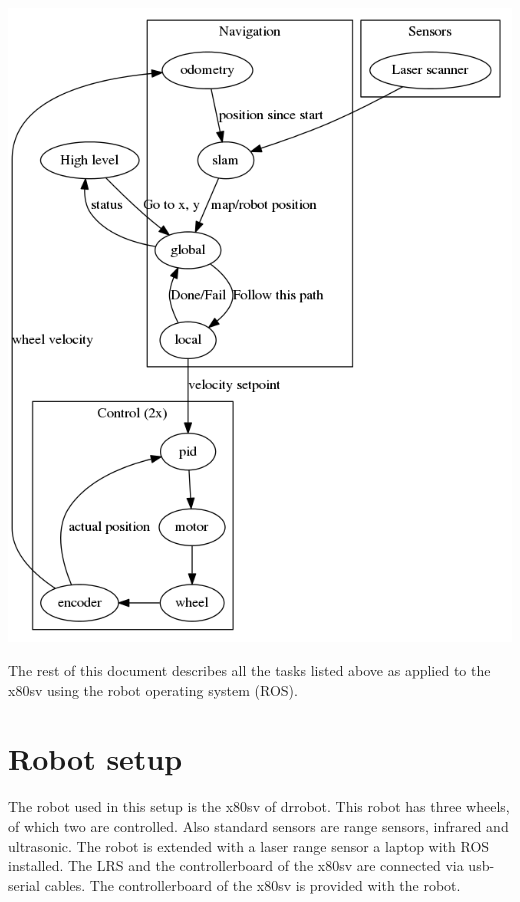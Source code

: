 \documentclass[a4paper]{article}
\begin{document}
\includegraphics[width=\textwidth,height=\textheight,keepaspectratio]{img/overview.png}

The rest of this document describes all the tasks listed above as applied to the x80sv using the robot operating system (ROS).

\section{Robot setup}
The robot used in this setup is the x80sv of drrobot. This robot has three wheels, of which
two are controlled. Also standard sensors are range sensors, infrared and ultrasonic.
The robot is extended with a laser range
sensor a laptop with ROS installed. The LRS and the controllerboard of the x80sv are
connected via usb-serial cables. The controllerboard of the x80sv is provided with
the robot.
\end{document}
